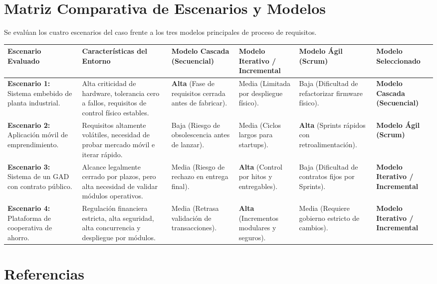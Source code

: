 \documentclass[conference]{IEEEtran}
\begin{document}
	\section{Matriz Comparativa de Escenarios y Modelos}
	Se evalúan los cuatro escenarios del caso frente a los tres modelos principales de proceso de requisitos.
	
	\begin{center}
		\centering
		\scriptsize
		\setlength{\tabcolsep}{3pt}
		\begin{tabularx}{\textwidth}{@{}p{2.6cm} Y p{1.8cm} p{1.8cm} p{1.8cm} p{2.2cm}@{}}
			\toprule
			\textbf{Escenario Evaluado} & \textbf{Características del Entorno} & \textbf{Modelo Cascada (Secuencial)} & \textbf{Modelo Iterativo / Incremental} & \textbf{Modelo Ágil (Scrum)} & \textbf{Modelo Seleccionado}\\
			\midrule
			\textbf{Escenario 1:} Sistema embebido de planta industrial. & Alta criticidad de hardware, tolerancia cero a fallos, requisitos de control físico estables. & \textbf{Alta} (Fase de requisitos cerrada antes de fabricar). & Media (Limitada por despliegue físico). & Baja (Dificultad de refactorizar firmware físico). & \textbf{Modelo Cascada (Secuencial)} \\
			\addlinespace[3pt]
			\textbf{Escenario 2:} Aplicación móvil de emprendimiento. & Requisitos altamente volátiles, necesidad de probar mercado móvil e iterar rápido. & Baja (Riesgo de obsolescencia antes de lanzar). & Media (Ciclos largos para startups). & \textbf{Alta} (Sprints rápidos con retroalimentación). & \textbf{Modelo Ágil (Scrum)} \\
			\addlinespace[3pt]
			\textbf{Escenario 3:} Sistema de un GAD con contrato público. & Alcance legalmente cerrado por plazos, pero alta necesidad de validar módulos operativos. & Media (Riesgo de rechazo en entrega final). & \textbf{Alta} (Control por hitos y entregables). & Baja (Dificultad de contratos fijos por Sprints). & \textbf{Modelo Iterativo / Incremental} \\
			\addlinespace[3pt]
			\textbf{Escenario 4:} Plataforma de cooperativa de ahorro. & Regulación financiera estricta, alta seguridad, alta concurrencia y despliegue por módulos. & Media (Retrasa validación de transacciones). & \textbf{Alta} (Incrementos modulares y seguros). & Media (Requiere gobierno estricto de cambios). & \textbf{Modelo Iterativo / Incremental} \\
			\bottomrule
		\end{tabularx}
	\end{center}
	
	\section{Referencias}
	\printbibliography[heading=none]
	
\end{document}
